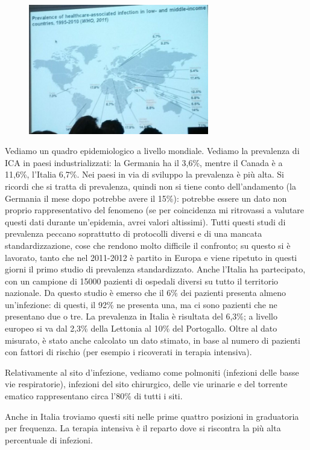 \begin{figure}[!ht]
\centering
	\includegraphics[width=0.7\textwidth]{19/image4.jpeg}
	\end{figure}

Vediamo un quadro epidemiologico a livello mondiale. Vediamo la
prevalenza di ICA in paesi industrializzati: la Germania ha il 3,6\%,
mentre il Canada è a 11,6\%, l'Italia 6,7\%. Nei paesi in via di
sviluppo la prevalenza è più alta. Si ricordi che si tratta di
prevalenza, quindi non si tiene conto dell'andamento (la Germania il
mese dopo potrebbe avere il 15\%): potrebbe essere un dato non proprio
rappresentativo del fenomeno (se per coincidenza mi ritrovassi a
valutare questi dati durante un'epidemia, avrei valori altissimi). Tutti
questi studi di prevalenza peccano soprattutto di protocolli diversi e
di una mancata standardizzazione, cose che rendono molto difficile il
confronto; su questo si è lavorato, tanto che nel 2011-2012 è partito in
Europa e viene ripetuto in questi giorni il primo studio di prevalenza
standardizzato. Anche l'Italia ha partecipato, con un campione di 15000
pazienti di ospedali diversi su tutto il territorio nazionale. Da questo
studio è emerso che il 6\% dei pazienti presenta almeno un'infezione: di
questi, il 92\% ne presenta una, ma ci sono pazienti che ne presentano
due o tre. La prevalenza in Italia è risultata del 6,3\%; a livello
europeo si va dal 2,3\% della Lettonia al 10\% del Portogallo. Oltre al
dato misurato, è stato anche calcolato un dato stimato, in base al
numero di pazienti con fattori di rischio (per esempio i ricoverati in
terapia intensiva).

Relativamente al sito d'infezione, vediamo come polmoniti (infezioni
delle basse vie respiratorie), infezioni del sito chirurgico, delle vie
urinarie e del torrente ematico rappresentano circa l'80\% di tutti i
siti.

Anche in Italia troviamo questi siti nelle prime quattro posizioni in
graduatoria per frequenza. La terapia intensiva è il reparto dove si
riscontra la più alta percentuale di infezioni.


